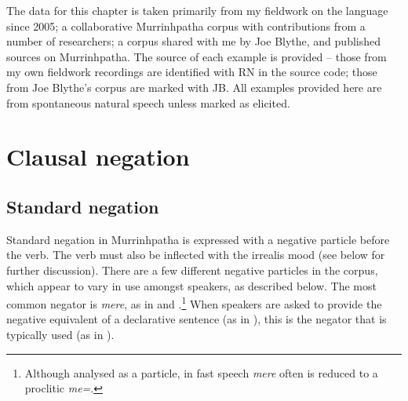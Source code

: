 \documentclass[output=paper,colorlinks,citecolor=brown]{langscibook}
\begin{document}
The data for this chapter is taken primarily from my fieldwork on the language since 2005; a collaborative Murrinhpatha corpus \citep{MansfieldEtAl2019} with contributions from a number of researchers; a corpus shared with me by Joe Blythe, and published sources on Murrinhpatha. The source of each example is provided – those from my own fieldwork recordings are identified with RN in the source code; those from Joe Blythe’s corpus are marked with JB. All examples provided here are from spontaneous natural speech unless marked as elicited. 

\section{Clausal negation} \label{sec:mur:2}
\subsection{Standard negation} \label{sec:mur:2.1}

Standard negation in Murrinhpatha is expressed with a negative particle before the verb. The verb must also be inflected with the irrealis mood (see below for further discussion). There are a few different negative particles in the corpus, which appear to vary in use amongst speakers, as described below. The most common negator is \textit{mere}, as in  and .\footnote{Although analysed as a particle, in fast speech \textit{mere} often is reduced to a proclitic \textit{me=}.}  When speakers are asked to provide the negative equivalent of a declarative sentence (as in ), this is the negator that is typically used (as in ).
\end{document}
